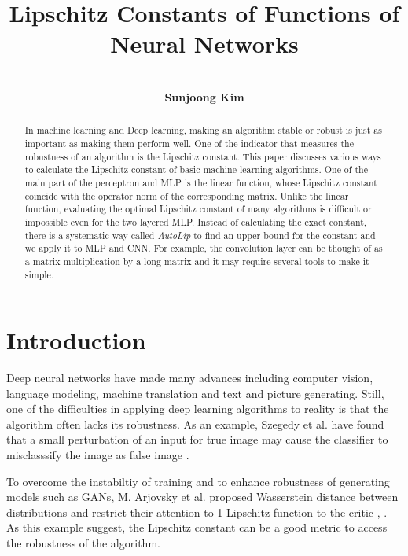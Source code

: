 \documentclass[12pt]{report}
\numberwithin{figure}{chapter}
\theoremstyle{plain}
\theoremstyle{definition}
\theoremstyle{corollary}
\theoremstyle{definition}
\theoremstyle{plain}
\theoremstyle{definition}
\theoremstyle{plain}
\begin{document}
\title{\textbf{Lipschitz Constants of Functions of Neural Networks}}
\author{\\\textbf{Sunjoong Kim}\\}
\setcounter{tocdepth}{1}
\date{}
 \maketitle{}

\tableofcontents

\newpage
\begin{abstract}
In machine learning and Deep learning, making an algorithm stable or robust is just as important as making them perform well.
One of the indicator that measures the robustness of an algorithm is the Lipschitz constant.
This paper discusses various ways to calculate the Lipschitz constant of basic machine learning algorithms.
One of the  main part of the perceptron and MLP is the linear function, whose Lipschitz constant coincide with the operator norm of the corresponding matrix.
Unlike the linear function, evaluating the optimal Lipschitz constant of many algorithms is difficult or impossible even for the two layered MLP.
Instead of calculating the exact constant, there is a systematic way called \emph{AutoLip} to find an upper bound for the constant and we apply it to MLP and CNN.
For example, the convolution layer can be thought of as a matrix multiplication by a long matrix and it may require several tools to make it simple.
\end{abstract}
\newpage
\setcounter{page}{1} \setcounter{section}{0}


\chapter{Introduction}

Deep neural networks have made many advances including computer vision, language modeling, machine translation and text and picture generating.
Still, one of the difficulties in applying deep learning algorithms to reality is that the algorithm often lacks its robustness.
As an example, Szegedy et al. have found that a small perturbation of an input for true image may cause the classifier to misclasssify the image as false image \cite{CS-WZ}.

To overcome the instabiltiy of training and to enhance robustness of generating models such as GANs, M. Arjovsky et al. proposed Wasserstein distance between distributions and restrict their attention to 1-Lipschitz function to the critic \cite{MA-SC}, \cite{GI-AF}.
As this example suggest, the Lipschitz constant can be a good metric to access the robustness of the algorithm.
\end{document}
